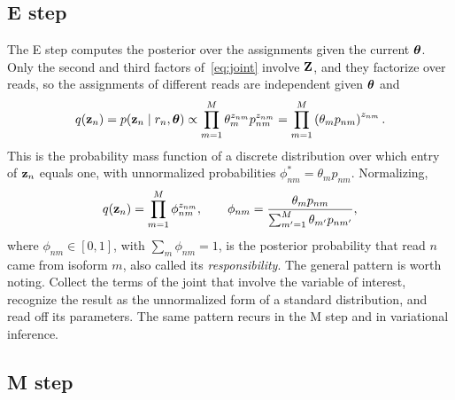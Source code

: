 \subsection{E step}

The E step computes the posterior over the assignments given the current $\boldsymbol{\theta}$. Only the second and third factors of~\eqref{eq:joint} involve $\mathbf{Z}$, and they factorize over reads, so the assignments of different reads are independent given $\boldsymbol{\theta}$ and
\begin{equation}
  q(\mathbf{z}_n) = p(\mathbf{z}_n\mid r_n,\boldsymbol{\theta}) \propto \prod_{m=1}^M\theta_m^{z_{nm}}p_{nm}^{z_{nm}} = \prod_{m=1}^M\left(\theta_m p_{nm}\right)^{z_{nm}} .
\end{equation}
This is the probability mass function of a discrete distribution over which entry of $\mathbf{z}_n$ equals one, with unnormalized probabilities $\phi^*_{nm}=\theta_m p_{nm}$. Normalizing,
\begin{equation}
  q(\mathbf{z}_n) = \prod_{m=1}^M\phi_{nm}^{z_{nm}}, \qquad
  \phi_{nm} = \frac{\theta_m p_{nm}}{\sum_{m'=1}^M\theta_{m'}p_{nm'}} ,
  \label{eq:estep}
\end{equation}
where $\phi_{nm}\in[0,1]$, with $\sum_m\phi_{nm}=1$, is the posterior probability that read $n$ came from isoform $m$, also called its \emph{responsibility}. The general pattern is worth noting. Collect the terms of the joint that involve the variable of interest, recognize the result as the unnormalized form of a standard distribution, and read off its parameters. The same pattern recurs in the M step and in variational inference.

\subsection{M step}

